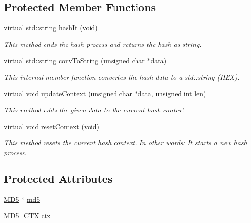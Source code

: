 \subsection*{Protected Member Functions}
\begin{DoxyCompactItemize}
\item 
virtual std::string \hyperlink{classmd5wrapper_ab146103eb1283aaf0a83ae5e8101af26}{hashIt} (void)
\begin{DoxyCompactList}\small\item\em This method ends the hash process and returns the hash as string. \item\end{DoxyCompactList}\item 
virtual std::string \hyperlink{classmd5wrapper_a4b2bd3d8cb53e4f24d843b1c17089c9c}{convToString} (unsigned char $\ast$data)
\begin{DoxyCompactList}\small\item\em This internal member-\/function convertes the hash-\/data to a std::string (HEX). \item\end{DoxyCompactList}\item 
virtual void \hyperlink{classmd5wrapper_a6ab84182cd32d43f5fd05bfb68bbc133}{updateContext} (unsigned char $\ast$data, unsigned int len)
\begin{DoxyCompactList}\small\item\em This method adds the given data to the current hash context. \item\end{DoxyCompactList}\item 
virtual void \hyperlink{classmd5wrapper_a1e96064bfbb4156962d419f87ad684aa}{resetContext} (void)
\begin{DoxyCompactList}\small\item\em This method resets the current hash context. In other words: It starts a new hash process. \item\end{DoxyCompactList}\end{DoxyCompactItemize}
\subsection*{Protected Attributes}
\begin{DoxyCompactItemize}
\item 
\hyperlink{class_m_d5}{MD5} $\ast$ \hyperlink{classmd5wrapper_afe675f7d8993ec64ddefa902dff431fa}{md5}
\item 
\hyperlink{struct_m_d5___c_t_x}{MD5\_\-CTX} \hyperlink{classmd5wrapper_a00cf50f92e684cdaf85f6a5c1d1ac2dd}{ctx}
\end{DoxyCompactItemize}


